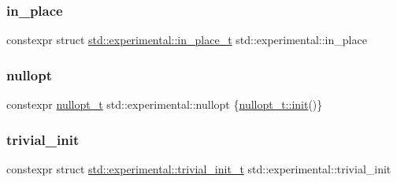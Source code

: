 \subsubsection{\texorpdfstring{in\+\_\+place}{in\_place}}
{\footnotesize\ttfamily constexpr struct \hyperlink{structstd_1_1experimental_1_1in__place__t}{std\+::experimental\+::in\+\_\+place\+\_\+t}  std\+::experimental\+::in\+\_\+place}

\mbox{\label{namespacestd_1_1experimental_af16e944368340cafdc29647c42a1f542}} 
\subsubsection{\texorpdfstring{nullopt}{nullopt}}
{\footnotesize\ttfamily constexpr \hyperlink{structstd_1_1experimental_1_1nullopt__t}{nullopt\+\_\+t} std\+::experimental\+::nullopt \{\hyperlink{structstd_1_1experimental_1_1nullopt__t_1_1init}{nullopt\+\_\+t\+::init}()\}}

\mbox{\label{namespacestd_1_1experimental_a453a56e465f134032297679f0511f02b}} 
\subsubsection{\texorpdfstring{trivial\+\_\+init}{trivial\_init}}
{\footnotesize\ttfamily constexpr struct \hyperlink{structstd_1_1experimental_1_1trivial__init__t}{std\+::experimental\+::trivial\+\_\+init\+\_\+t}  std\+::experimental\+::trivial\+\_\+init}

